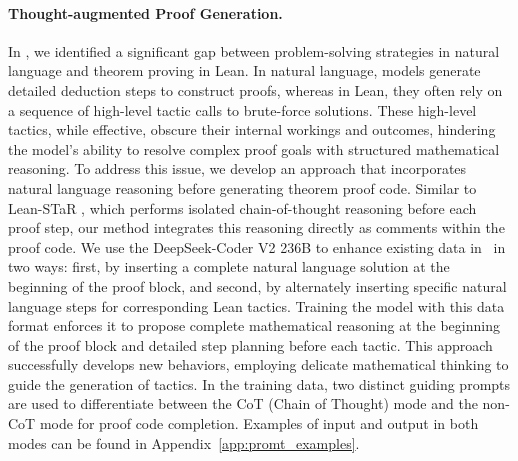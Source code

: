 \vspace{-0.1in}

\paragraph{Thought-augmented Proof Generation. } \label{sec:thought-augmented_proof_generation}
In \lastwork, we identified a significant gap between problem-solving strategies in natural language and theorem proving in Lean. In natural language, models generate detailed deduction steps to construct proofs, whereas in Lean, they often rely on a sequence of high-level tactic calls to brute-force solutions. These high-level tactics, while effective, obscure their internal workings and outcomes, hindering the model's ability to resolve complex proof goals with structured mathematical reasoning. To address this issue, we develop an approach that incorporates natural language reasoning before generating theorem proof code. Similar to Lean-STaR \citep{lin2024lean}, which performs isolated chain-of-thought reasoning \citep{wei2022chain, feng2024towards} before each proof step, our method integrates this reasoning directly as comments within the proof code. We use the DeepSeek-Coder V2 236B \citep{zhu2024deepseek} to enhance existing data in \lastwork~in two ways: first, by inserting a complete natural language solution at the beginning of the proof block, and second, by alternately inserting specific natural language steps for corresponding Lean tactics. Training the model with this data format enforces it to propose complete mathematical reasoning at the beginning of the proof block and detailed step planning before each tactic. This approach successfully develops new behaviors, employing delicate mathematical thinking to guide the generation of tactics. In the training data, two distinct guiding prompts are used to differentiate between the CoT (Chain of Thought) mode and the non-CoT mode for proof code completion. Examples of input and output in both modes can be found in Appendix~\ref{app:promt_examples}.

\vspace{-0.1in}


